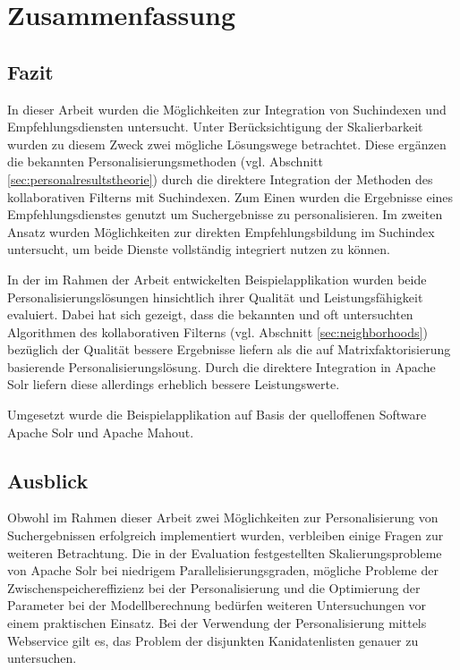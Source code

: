 
\section{Zusammenfassung}\label{sec:results}


\subsection{Fazit}

In dieser Arbeit wurden die Möglichkeiten zur Integration von Suchindexen und Empfehlungsdiensten untersucht. Unter Berücksichtigung der Skalierbarkeit wurden zu diesem Zweck zwei mögliche Lösungswege betrachtet. Diese ergänzen die bekannten Personalisierungsmethoden (vgl. Abschnitt \ref{sec:personalresultstheorie}) durch die direktere Integration der Methoden des kollaborativen Filterns mit Suchindexen. Zum Einen wurden die Ergebnisse eines Empfehlungsdienstes genutzt um Suchergebnisse zu personalisieren. Im zweiten Ansatz wurden Möglichkeiten zur direkten Empfehlungsbildung im Suchindex untersucht, um beide Dienste vollständig integriert nutzen zu können.

In der im Rahmen der Arbeit entwickelten Beispielapplikation wurden beide Personalisierungslösungen hinsichtlich ihrer Qualität und Leistungsfähigkeit evaluiert. Dabei hat sich gezeigt, dass die bekannten und oft untersuchten Algorithmen des kollaborativen Filterns (vgl. Abschnitt \ref{sec:neighborhoods}) bezüglich der Qualität bessere Ergebnisse liefern als die auf Matrixfaktorisierung basierende Personalisierungslösung. Durch die direktere Integration in Apache Solr liefern diese allerdings erheblich bessere Leistungswerte.

Umgesetzt wurde die Beispielapplikation auf Basis der quelloffenen Software Apache Solr und Apache Mahout.
\newpage
\subsection{Ausblick}

Obwohl im Rahmen dieser Arbeit zwei Möglichkeiten zur Personalisierung von Suchergebnissen erfolgreich implementiert wurden, verbleiben einige Fragen zur weiteren Betrachtung. Die in der Evaluation festgestellten Skalierungsprobleme von Apache Solr bei niedrigem Parallelisierungsgraden, mögliche Probleme der Zwischenspeichereffizienz bei der Personalisierung und die Optimierung der Parameter bei der Modellberechnung bedürfen weiteren Untersuchungen vor einem praktischen Einsatz. Bei der Verwendung der Personalisierung mittels Webservice gilt es, das Problem der disjunkten Kanidatenlisten genauer zu untersuchen.

